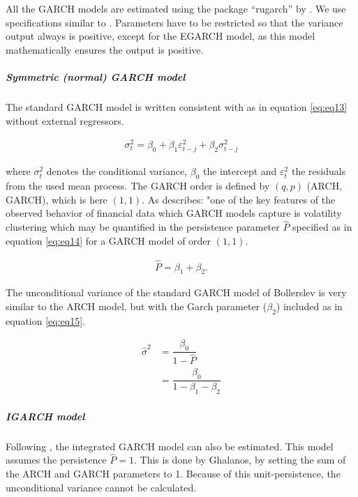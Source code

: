 \documentclass[a4paper, nobind]{templates/ociamthesis}
\begin{document}
All the GARCH models are estimated using the package ``rugarch'' by \textcite{alexios2020}. We use specifications similar to \textcite{ghalanos2020}. Parameters have to be restricted so that the variance output always is positive, except for the EGARCH model, as this model mathematically ensures the output is positive.

\hypertarget{symmetric-normal-garch-model}{%
\subparagraph{Symmetric (normal) GARCH model}\label{symmetric-normal-garch-model}}

\noindent The standard GARCH model \autocite{bollerslev1986} is written consistent with \textcite{ghalanos2020} as in equation \eqref{eq:eq13} without external regressors.

\begin{align}
\sigma_t^2 = \beta_0  +  {\beta_1}\varepsilon _{t-j}^2 + {\beta_2}\sigma_{t-j}^2
 \label{eq:eq13}
\end{align}

\noindent where \(\sigma_t^2\) denotes the conditional variance, \(\beta_0\) the intercept and \(\varepsilon_t^2\) the residuals from the used mean process. The GARCH order is defined by \((q, p)\) (ARCH, GARCH), which is here \((1, 1)\). As \textcite{ghalanos2020} describes: "one of the key features of the observed behavior of financial data which GARCH models capture is volatility clustering which may be quantified in the persistence parameter \(\hat{P}\) specified as in equation \eqref{eq:eq14} for a GARCH model of order \((1,1)\).

\begin{align}
\hat{P} =  \beta_1  + \beta_2.
 \label{eq:eq14}
\end{align}

\noindent The unconditional variance of the standard GARCH model of Bollerslev is very similar to the ARCH model, but with the Garch parameter (\(\beta_2\)) included as in equation \eqref{eq:eq15}.

\begin{equation}
\begin{split}
\hat{\sigma}^2 
&= \dfrac{\beta_0}{1 - \hat{P}} \\
&= \dfrac{\beta_0}{1 - \beta_1 - \beta_2}
\end{split}
 \label{eq:eq15}
\end{equation}

\hypertarget{igarch-model}{%
\subparagraph{IGARCH model}\label{igarch-model}}

\noindent Following \textcite{ghalanos2020}, the integrated GARCH model \autocite{bollerslev1986} can also be estimated. This model assumes the persistence \(\hat{P} = 1\). This is done by Ghalanos, by setting the sum of the ARCH and GARCH parameters to 1. Because of this unit-persistence, the unconditional variance cannot be calculated.
\end{document}

